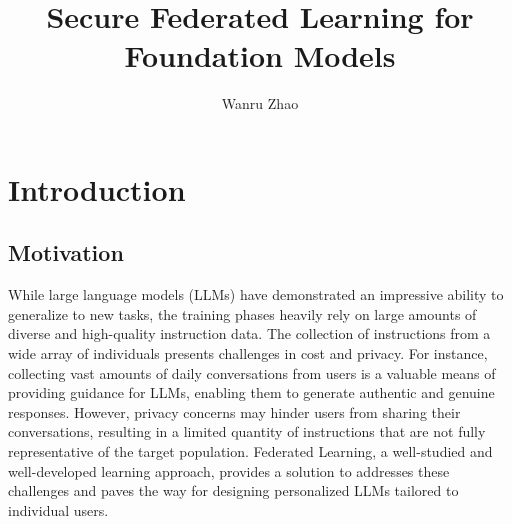 \documentclass[withindex,glossary,firstyr]{cam-thesis}
\title{Secure Federated Learning for Foundation Models}
\author{Wanru Zhao}
\begin{document}

\frontmatter{}



\chapter{Introduction}



\section{Motivation}

While large language models (LLMs) have demonstrated an impressive ability to generalize to new tasks, the training phases heavily rely on large amounts of diverse and high-quality instruction data. The collection of instructions from a wide array of individuals presents challenges in cost and privacy. For instance, collecting vast amounts of daily conversations from users is a valuable means of providing guidance for LLMs, enabling them to generate authentic and genuine responses. However, privacy concerns may hinder users from sharing their conversations, resulting in a limited quantity of instructions that are not fully representative of the target population. Federated Learning, a well-studied and well-developed learning approach, provides a solution to addresses these challenges and paves the way for designing personalized LLMs tailored to individual users.
\end{document}
